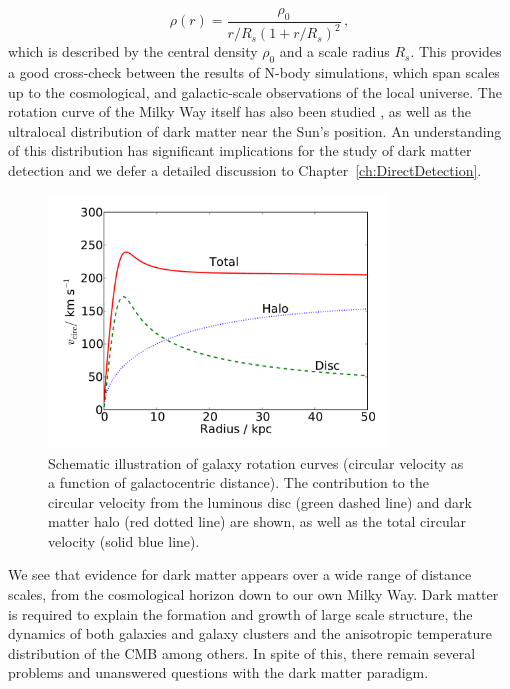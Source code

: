 \begin{equation}
\label{eq:intro:NFW}
\rho(r) = \frac{\rho_0}{r/R_s(1 + r/R_s)^2}\,,
\end{equation}
which is described by the central density $\rho_0$ and a scale radius $R_s$. This provides a good cross-check between the results of N-body simulations, which span scales up to the cosmological, and galactic-scale observations of the local universe. The rotation curve of the Milky Way itself has also been studied , as well as the ultralocal distribution of dark matter near the Sun's position. An understanding of this distribution has significant implications for the study of dark matter detection and we defer a detailed discussion to Chapter~\ref{ch:DirectDetection}.

\begin{figure}[h]

  \centering
  \includegraphics[width=0.8\textwidth]{RotationCurve.pdf}
  \caption[Schematic illustration of galaxy rotation curves]{Schematic illustration of galaxy rotation curves (circular velocity as a function of galactocentric distance). The contribution to the circular velocity from the luminous disc (green dashed line) and dark matter halo (red dotted line) are shown, as well as the total circular velocity (solid blue line). }
  \label{fig:intro:RotationCurves}
\end{figure}

We see that evidence for dark matter appears over a wide range of distance scales, from the cosmological horizon down to our own Milky Way. Dark matter is required to explain the formation and growth of large scale structure, the dynamics of both galaxies and galaxy clusters and the anisotropic temperature distribution of the CMB among others. In spite of this, there remain several problems and unanswered questions with the dark matter paradigm.


